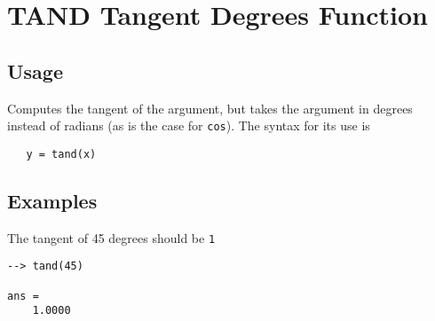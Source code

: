 \section{TAND Tangent Degrees Function}

\subsection{Usage}

Computes the tangent of the argument, but takes
the argument in degrees instead of radians (as is the case
for \verb|cos|). The syntax for its use is
\begin{verbatim}
   y = tand(x)
\end{verbatim}
\subsection{Examples}

The tangent of 45 degrees should be \verb|1|
\begin{verbatim}
--> tand(45)

ans = 
    1.0000 
\end{verbatim}
